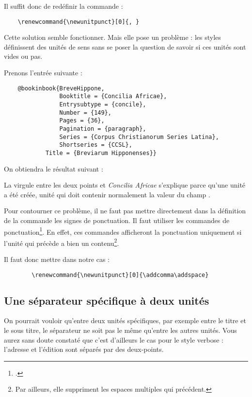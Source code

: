 	Il suffit donc de redéfinir la commande :
	
	\begin{verbatim}
	\renewcommand{\newunitpunct}[0]{, }
	\end{verbatim}
	
	Cette solution semble fonctionner. Mais elle pose un problème : les styles définissent des unités de sens sans se poser la question de savoir si ces unités sont vides ou pas.
	
	Prenons l'entrée suivante :
	
		
	\begin{verbatim}
	@bookinbook{BreveHippone,
        		Booktitle = {Concilia Africae},
        		Entrysubtype = {concile},
        		Number = {149},
        		Pages = {36},
        		Pagination = {paragraph},
        		Series = {Corpus Christianorum Series Latina},
        		Shortseries = {CCSL},
       		Title = {Breviarum Hipponenses}}	
	\end{verbatim}
	
	On obtiendra le résultat suivant :
	
	\begin{quotation}
		\cite{BreveHippone}
	\end{quotation}
	
	La virgule entre les deux points et \emph{Concilia Africae} s'explique parce qu'une unité a été créée, unité qui doit contenir normalement la valeur du champ .
	
	Pour contourner ce problème, il ne faut pas mettre directement dans la définition de la commande  les signes de ponctuation. Il faut utiliser les commandes de ponctuation\footcite[Listées dans][160-161]{biblatex}. En effet, ces commandes afficheront la ponctuation uniquement si l'unité qui précède a bien un contenu\footnote{Par ailleurs, elle suppriment les espaces multiples qui précédent.}.
	
	Il faut donc mettre dans notre cas :
	
	\begin{verbatim}
		\renewcommand{\newunitpunct}[0]{\addcomma\addspace}
	\end{verbatim}
	
	
	\subsection{Une séparateur spécifique à deux unités}
	
	On pourrait vouloir qu'entre deux unités spécifiques, par exemple entre le titre et le sous titre, le séparateur ne soit pas le même qu'entre les autres unités.	Vous aurez sans doute constaté que c'est d'ailleurs le cas pour le style verbose : l'adresse et l'édition sont séparés par des deux-points.
	
